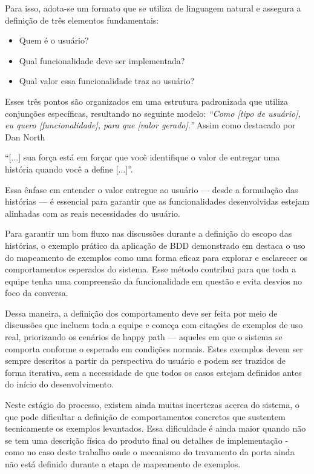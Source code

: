Para isso, adota-se um formato que se utiliza de linguagem natural e assegura a definição de três elementos fundamentais:

\begin{itemize}
	\item Quem é o usuário?
	\item Qual funcionalidade deve ser implementada?
	\item Qual valor essa funcionalidade traz ao usuário?
\end{itemize}

Esses três pontos são organizados em uma estrutura padronizada que utiliza conjunções específicas, resultando no seguinte modelo:
\textit{“Como [tipo de usuário], eu quero [funcionalidade], para que [valor gerado].”}
Assim como destacado por Dan North 
\begin{citacao}
“[...] sua força está em forçar que você identifique o valor de entregar uma história quando você a define [...]”. \cite{north2006bdd}
\end{citacao}
Essa ênfase em entender o valor entregue ao usuário — desde a formulação das histórias — é essencial para garantir que as funcionalidades desenvolvidas estejam 
alinhadas com as reais necessidades do usuário.

Para garantir um bom fluxo nas discussões durante a definição do escopo das histórias, o exemplo prático da aplicação de BDD demonstrado em \cite{Lawrence2019cucumber} 
destaca o uso do mapeamento de exemplos como uma forma eficaz para explorar e esclarecer os comportamentos esperados do sistema. Esse método contribui para que 
toda a equipe tenha uma compreensão da funcionalidade em questão e evita desvios no foco da conversa.

Dessa maneira, a definição dos comportamento deve ser feita por meio de discussões que incluem toda a equipe e começa com citações de exemplos de uso real, priorizando 
os cenários de happy path — aqueles em que o sistema se comporta conforme o esperado em condições normais. Estes exemplos devem ser sempre descritos a partir da 
perspectiva do usuário e podem ser trazidos de forma iterativa, sem a necessidade de que todos os casos estejam definidos antes do início do desenvolvimento.

Neste estágio do processo, existem ainda muitas incertezas acerca do sistema, o que pode dificultar a definição de comportamentos concretos que sustentem 
tecnicamente os exemplos levantados. Essa dificuldade é ainda maior quando não se tem uma descrição física do produto final ou detalhes de implementação - como no 
caso deste trabalho onde o mecanismo do travamento da porta ainda não está definido durante a etapa de mapeamento de exemplos.

